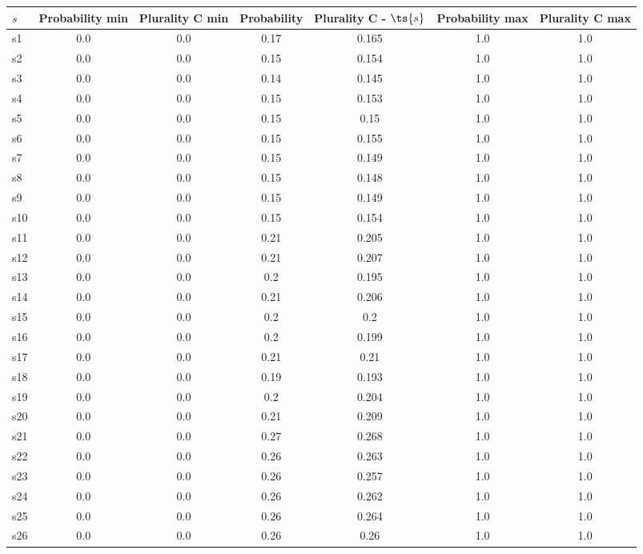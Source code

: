 \documentclass{article}
\begin{document}
\noindent\begin{tabular}{|l|c|c|c|c|c|c|}
\hline
$s$& Probability min & Plurality C min & Probability & Plurality C - $\ts{s}$ & Probability max & Plurality C max\\
\hline
s1 &0.0 & 0.0 & 0.17 & 0.165 & 1.0 & 1.0\\
\hline
s2 &0.0 & 0.0 & 0.15 & 0.154 & 1.0 & 1.0\\
\hline
s3 &0.0 & 0.0 & 0.14 & 0.145 & 1.0 & 1.0\\
\hline
s4 &0.0 & 0.0 & 0.15 & 0.153 & 1.0 & 1.0\\
\hline
s5 &0.0 & 0.0 & 0.15 & 0.15 & 1.0 & 1.0\\
\hline
s6 &0.0 & 0.0 & 0.15 & 0.155 & 1.0 & 1.0\\
\hline
s7 &0.0 & 0.0 & 0.15 & 0.149 & 1.0 & 1.0\\
\hline
s8 &0.0 & 0.0 & 0.15 & 0.148 & 1.0 & 1.0\\
\hline
s9 &0.0 & 0.0 & 0.15 & 0.149 & 1.0 & 1.0\\
\hline
s10 &0.0 & 0.0 & 0.15 & 0.154 & 1.0 & 1.0\\
\hline
s11 &0.0 & 0.0 & 0.21 & 0.205 & 1.0 & 1.0\\
\hline
s12 &0.0 & 0.0 & 0.21 & 0.207 & 1.0 & 1.0\\
\hline
s13 &0.0 & 0.0 & 0.2 & 0.195 & 1.0 & 1.0\\
\hline
s14 &0.0 & 0.0 & 0.21 & 0.206 & 1.0 & 1.0\\
\hline
s15 &0.0 & 0.0 & 0.2 & 0.2 & 1.0 & 1.0\\
\hline
s16 &0.0 & 0.0 & 0.2 & 0.199 & 1.0 & 1.0\\
\hline
s17 &0.0 & 0.0 & 0.21 & 0.21 & 1.0 & 1.0\\
\hline
s18 &0.0 & 0.0 & 0.19 & 0.193 & 1.0 & 1.0\\
\hline
s19 &0.0 & 0.0 & 0.2 & 0.204 & 1.0 & 1.0\\
\hline
s20 &0.0 & 0.0 & 0.21 & 0.209 & 1.0 & 1.0\\
\hline
s21 &0.0 & 0.0 & 0.27 & 0.268 & 1.0 & 1.0\\
\hline
s22 &0.0 & 0.0 & 0.26 & 0.263 & 1.0 & 1.0\\
\hline
s23 &0.0 & 0.0 & 0.26 & 0.257 & 1.0 & 1.0\\
\hline
s24 &0.0 & 0.0 & 0.26 & 0.262 & 1.0 & 1.0\\
\hline
s25 &0.0 & 0.0 & 0.26 & 0.264 & 1.0 & 1.0\\
\hline
s26 &0.0 & 0.0 & 0.26 & 0.26 & 1.0 & 1.0\\
\hline

\end{tabular}
\end{document}
